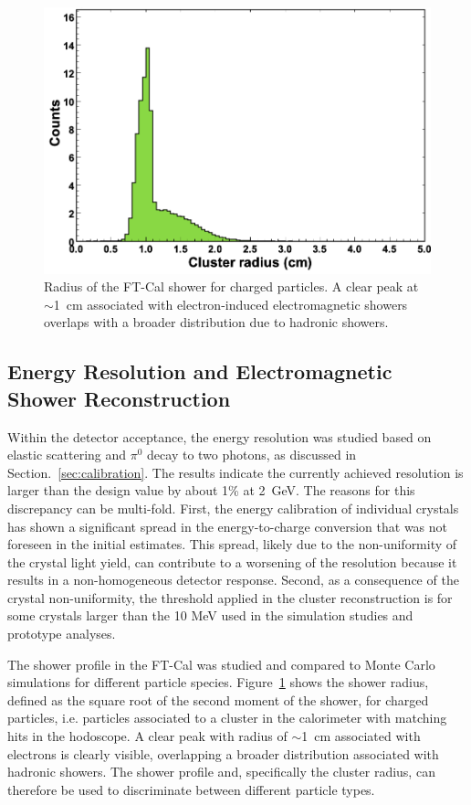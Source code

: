 \begin{figure}[h]
\includegraphics[height=0.65\columnwidth]{fig/ft_shower.png}
\caption{Radius of the FT-Cal shower for charged particles. A clear peak at $\sim$1~cm associated with
  electron-induced electromagnetic showers overlaps with a broader distribution due to hadronic showers.}
\label{fig:ft_shower}
\end{figure}

\subsection{Energy Resolution and Electromagnetic Shower Reconstruction}

Within the detector acceptance, the energy resolution was studied based on elastic scattering and $\pi^0$ decay to
two photons, as discussed in Section.~\ref{sec:calibration}. The results indicate the currently achieved resolution is
larger than the design value by about 1\% at 2~GeV. The reasons for this discrepancy can be multi-fold. First, the
energy calibration of individual crystals has shown a significant spread in the energy-to-charge conversion that was
not foreseen in the initial estimates. This spread, likely due to the non-uniformity of the crystal light yield, can
contribute to a worsening of the resolution because it results in a non-homogeneous detector response.  Second, as a consequence of the crystal non-uniformity, the threshold applied in the cluster reconstruction is for some crystals larger than the 10 MeV used in the simulation studies and prototype analyses.

The shower profile in the FT-Cal was studied and compared to Monte Carlo simulations for different particle
species. Figure~\ref{fig:ft_shower} shows the shower radius, defined as the square root of the second moment of
the shower, for charged particles, i.e. particles associated to a cluster in the calorimeter with matching hits in the
hodoscope. A clear peak with radius of $\sim$1~cm associated with electrons is clearly visible, overlapping a
broader distribution associated with hadronic showers. The shower profile and, specifically the cluster radius, can
therefore be used to discriminate between different particle types.

